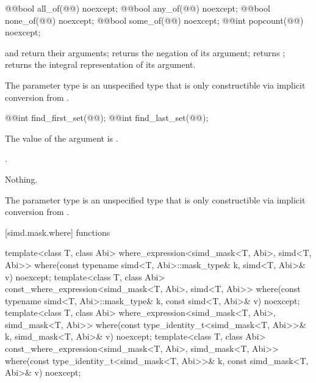 \begin{itemdecl}
@@bool all_of(@@) noexcept;
@@bool any_of(@@) noexcept;
@@bool none_of(@@) noexcept;
@@bool some_of(@@) noexcept;
@@int popcount(@@) noexcept;
\end{itemdecl}

\begin{itemdescr}
  \pnum\returns
   and  return their arguments;  returns the negation of its argument;  returns ;  returns the integral representation of its argument.

  \pnum\remarks
  The parameter type  is an unspecified type that is only constructible via implicit conversion from .
\end{itemdescr}

\begin{itemdecl}
@@int find_first_set(@@);
@@int find_last_set(@@);
\end{itemdecl}

\begin{itemdescr}
  \pnum\requires
  The value of the argument is .

  \pnum\returns
  .

  \pnum\throws Nothing.

  \pnum\remarks
  The parameter type  is an unspecified type that is only constructible via implicit conversion from .
\end{itemdescr}

[simd.mask.where]{ functions}

\begin{itemdecl}
template<class T, class Abi>
  where_expression<simd_mask<T, Abi>, simd<T, Abi>>
    where(const typename simd<T, Abi>::mask_type& k, simd<T, Abi>& v) noexcept;
template<class T, class Abi>
  const_where_expression<simd_mask<T, Abi>, simd<T, Abi>>
    where(const typename simd<T, Abi>::mask_type& k, const simd<T, Abi>& v) noexcept;
template<class T, class Abi>
  where_expression<simd_mask<T, Abi>, simd_mask<T, Abi>>
    where(const type_identity_t<simd_mask<T, Abi>>& k, simd_mask<T, Abi>& v) noexcept;
template<class T, class Abi>
  const_where_expression<simd_mask<T, Abi>, simd_mask<T, Abi>>
    where(const type_identity_t<simd_mask<T, Abi>>& k, const simd_mask<T, Abi>& v) noexcept;
\end{itemdecl}

